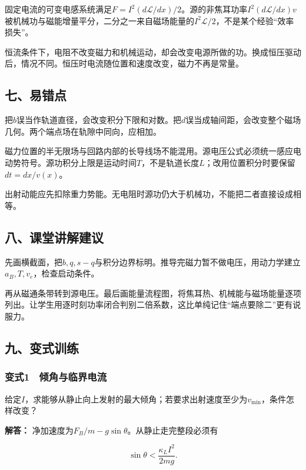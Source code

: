 \documentclass[12pt,a4paper,fontset=fandol]{ctexart}
\begin{document}
固定电流的可变电感系统满足\(F=I^2(d\mathcal L/dx)/2\)。源的非焦耳功率\(I^2(d\mathcal L/dx)v\)被机械功与磁能增量平分，二分之一来自磁场能量的\(I^2\mathcal L/2\)，不是某个经验``效率损失''。

恒流条件下，电阻不改变磁力和机械运动，却会改变电源所做的功。换成恒压驱动后，情况不同。恒压时电流随位置和速度改变，磁力不再是常量。

\subsection{七、易错点}\label{ux4e03ux6613ux9519ux70b9-2}

把\(b\)误当作轨道直径，会改变积分下限和对数。把\(d\)误当成轴间距，会改变整个磁场几何。两个端点场在轨隙中同向，应相加。

磁力位置的半无限场与回路内部的长导线场不能混用。源电压公式必须统一感应电动势符号。源功积分上限是运动时间\(T\)，不是轨道长度\(L\)；改用位置积分时要保留\(dt=dx/v(x)\)。

出射动能应先扣除重力势能。无电阻时源功仍大于机械功，不能把二者直接设成相等。

\subsection{八、课堂讲解建议}\label{ux516bux8bfeux5802ux8bb2ux89e3ux5efaux8bae-2}

先画横截面，把\(b,q,s-q\)与积分边界标明。推导完磁力暂不做电压，用动力学建立\(a_B,T,v_e\)，检查启动条件。

再从磁通条带转到源电压。最后画能量流程图，将焦耳热、机械能与磁场能量逐项列出。让学生用逐时刻功率闭合判别二倍系数，这比单纯记住``端点要除二''更有说服力。

\subsection{九、变式训练}\label{ux4e5dux53d8ux5f0fux8badux7ec3-2}

\subsubsection{变式1　倾角与临界电流}\label{ux53d8ux5f0f1-ux503eux89d2ux4e0eux4e34ux754cux7535ux6d41}

给定\(I\)，求能够从静止向上发射的最大倾角；若要求出射速度至少为\(v_{\min}\)，条件怎样改变？

\textbf{解答：} 净加速度为\(F_B/m-g\sin\theta\)。从静止走完整段必须有

\[
\sin\theta<\frac{\kappa_LI^2}{2mg}.
\]
\end{document}
